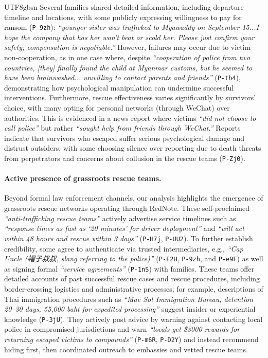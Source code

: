 \documentclass[sigconf,nonacm]{acmart}
\begin{document}
\begin{CJK}{UTF8}{gbsn}
Several families shared detailed information, including departure timeline and locations, with some publicly expressing willingness to pay for ransom (\texttt{P-9zh}): \textit{``younger sister was trafficked to Myawaddy on September 15...I hope the company that has her won't beat or scold her. Please just confirm your safety; compensation is negotiable.''} However, failures may occur due to victim non-cooperation, as in one case where, despite \textit{``cooperation of police from two countries, [they] finally found the child at Myanmar customs, but he seemed to have been brainwashed... unwilling to contact parents and friends''} (\texttt{P-th4}), demonstrating how psychological manipulation can undermine successful interventions. Furthermore, rescue effectiveness varies significantly by survivors' choice, with many opting for personal networks (through WeChat) over authorities. This is evidenced in a news report where victims \textit{``did not choose to call police''} but rather \textit{``sought help from friends through WeChat.''} Reports indicate that survivors who escaped suffer serious psychological damage and distrust outsiders, with some choosing silence over reporting due to death threats from perpetrators and concerns about collusion in the rescue teams (\texttt{P-Zj0}).

\paragraph{\textbf{Active presence of grassroots rescue teams.}} Beyond formal law enforcement channels, our analysis highlights the emergence of grassroots rescue networks operating through RedNote. These self-proclaimed \textit{``anti-trafficking rescue teams''} actively advertise service timelines such as \textit{``response times as fast as `20 minutes' for driver deployment''} and \textit{``will act within 48 hours and rescue within 3 days''} (\texttt{P-H7j}, \texttt{P-UU2}). To further establish credibility, some agree to authenticate via trusted intermediaries, e.g., \textit{``Cap Uncle (帽子叔叔, slang referring to the police)''} (\texttt{P-F2H}, \texttt{P-9zh}, and \texttt{P-e9F}) as well as signing formal \textit{``service agreements''} (\texttt{P-1nS}) with families. These teams offer detailed accounts of past successful rescue cases and rescue procedures, including border-crossing logistics and administrative processes; for example, descriptions of Thai immigration procedures such as \textit{``Mae Sot Immigration Bureau, detention 20--30 days, 55,000 baht for expedited processing'' } suggest insider or experiential knowledge (\texttt{P-3jU}). They actively post advice by warning against contacting local police in compromised jurisdictions and warn \textit{``locals get \$3000 rewards for returning escaped victims to compounds''} (\texttt{P-m6R}, \texttt{P-D2Y}) and instead recommend hiding first, then coordinated outreach to embassies and vetted rescue teams.


\end{CJK}
\end{document}
